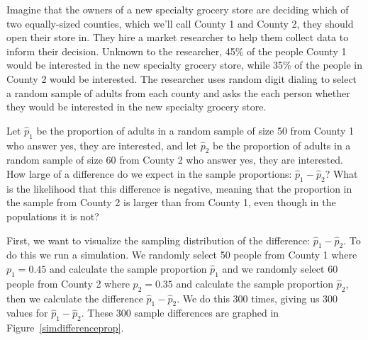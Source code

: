 Imagine that the owners of a new specialty grocery store are deciding which of two equally-sized counties, which we'll call County 1 and County 2, they should open their store in.  They hire a market researcher to help them collect data to inform their decision.  Unknown to the researcher, 45\% of the people County 1 would be interested in the new specialty grocery store, while 35\% of the people in County 2 would be interested.  The researcher uses random digit dialing to select a random sample of adults from each county and asks the each person whether they would be interested in the new specialty grocery store.  

Let $\hat{p}_1$ be the proportion of adults in a random sample of size 50 from County 1 who answer yes, they are interested, and let $\hat{p}_2$ be the  proportion of adults in a random sample of size 60 from County 2 who answer yes, they are interested.  How large of a difference do we expect in the sample proportions:  $\hat{p}_1-\hat{p}_2$?  What is the likelihood that this difference is negative, meaning that the proportion in the sample from County 2 is larger than from County 1, even though in the populations it is not?  

First, we want to visualize the sampling distribution of the difference: $\hat{p}_1-\hat{p}_2$. To do this we run a simulation.  We randomly select 50 people from County 1 where $p_1=0.45$ and calculate the sample proportion $\hat{p}_1$ and we randomly select 60 people from County 2 where $p_2=0.35$ and calculate the sample proportion $\hat{p}_2$, then we calculate the difference $\hat{p}_1-\hat{p}_2$.  We do this 300 times, giving us 300 values for $\hat{p}_1-\hat{p}_2$.  These 300 sample differences are graphed in Figure~\ref{simdifferenceprop}.  

